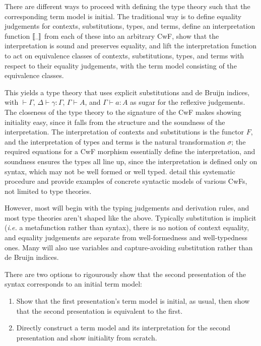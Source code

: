 \documentclass{article}
\makeatletter
\newcommand{\ie}{\textit{i.e.}\@\xspace}
\renewcommand{\_}{\textrm{\textscale{.5}{\textunderscore}}}
\DeclarePairedDelimiter{\interp}{\llbracket}{\rrbracket}
\newcommand{\nt}{\sigma}
\theoremstyle{definition}
\theoremstyle{plain}
\makeatother
\begin{document}
There are different ways to proceed with defining the type theory such that the corresponding term model is initial.
The traditional way is to define equality judgements for contexts, substitutions, types, and terms,
define an interpretation function $\interp{\_}$ from each of these into an arbitrary CwF,
show that the interpretation is sound and preserves equality,
and lift the interpretation function to act on equivalence classes of contexts, substitutions, types, and terms
with respect to their equality judgements,
with the term model consisting of the equivalence classes.
%
%
This yields a type theory that uses explicit substitutions and de Bruijn indices,
with $\vdash \Gamma$, $\Delta \vdash \gamma : \Gamma$, $\Gamma \vdash A$, and $\Gamma \vdash a : A$
as sugar for the reflexive judgements.
The closeness of the type theory to the signature of the CwF makes showing initiality easy,
since it falls from the structure and the soundness of the interpretation.
The interpretation of contexts and substitutions is the functor $F$,
and the interpretation of types and terms is the natural transformation $\nt$;
the required equations for a CwF morphism essentially define the interpretation,
and soundness ensures the types all line up, since the interpretation is defined only on syntax,
which may not be well formed or well typed. \citet{undeceq,gatcwf} detail this systematic procedure
and provide examples of concrete syntactic models of various CwFs, not limited to type theories.

However, most will begin with the typing judgements and derivation rules,
and most type theories aren't shaped like the above.
Typically substitution is implicit (\ie a metafunction rather than syntax),
there is no notion of context equality,
and equality judgements are separate from well-formedness and well-typedness ones.
Many will also use variables and capture-avoiding substitution
rather than de Bruijn indices.
%
%
There are two options to rigourously show that the second presentation of the syntax corresponds to an initial term model:
\begin{enumerate}
    \item Show that the first presentation's term model is initial, as usual,
    then show that the second presentation is equivalent to the first.
    \item Directly construct a term model and its interpretation for the second presentation
    and show initiality from scratch.
\end{enumerate}
\end{document}
